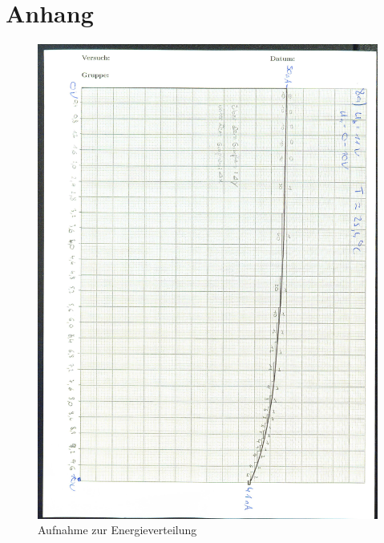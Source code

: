 \section{Anhang}
\begin{figure}[p]
  \centering
  \includegraphics[width=\textwidth]{content/downKurve.jpg}
  \caption{Aufnahme zur Energieverteilung}
  \label{Bild:1}
\end{figure}
